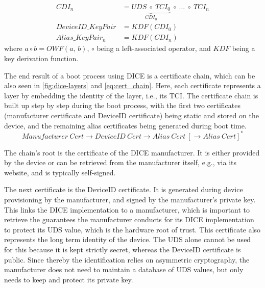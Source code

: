 \noindent
\begin{minipage}{\linewidth}
\begin{align}
  \label{eq:dice_cdi}
  CDI_n &= \underbrace{UDS\ \circ\ TCI_0}_{CDI_0}\ \circ\ \ldots\ \circ\ TCI_n\\
  \label{eq:dice_deviceID}
  DeviceID\_KeyPair &= KDF(CDI_0)\\
  \label{eq:dice_alias}
  Alias\_KeyPair_n  &= KDF(CDI_n)
\end{align}
where \(a \circ b = OWF(a,\,b)\), \(\circ\) being a left-associated operator, and \(KDF\) being a key derivation function.
\end{minipage}
\baselineskip


The end result of a boot process using \ac{DICE} is a certificate chain, which can be also seen in \autoref{fig:dice-layers} and \autoref{eq:cert_chain}.
Here, each certificate represents a layer by embedding the identity of the layer, i.e., its \ac{TCI}\@.
The certificate chain is built up step by step during the boot process, with the first two certificates (manufacturer certificate and DeviceID certificate) being static and stored on the device, and the remaining alias certificates being generated during boot time.
\begin{equation}
  \label{eq:cert_chain}
  Manufacturer\ Cert \rightarrow DeviceID\ Cert \rightarrow Alias\ Cert\ [\rightarrow Alias\ Cert]^*
\end{equation}

The chain's root is the certificate of the DICE manufacturer.
It is either provided by the device or can be retrieved from the manufacturer itself, e.g., via its website, and is typically self-signed.




The next certificate is the DeviceID certificate.
It is generated during device provisioning by the manufacturer, and signed by the manufacturer's private key.
This links the DICE implementation to a manufacturer, which is important to retrieve the guarantees the manufacturer conducts for its DICE implementation to protect its \ac{UDS} value, which is the hardware root of trust.
This certificate also represents the long term identity of the device.
The \ac{UDS} alone cannot be used for this because it is kept strictly secret, whereas the DeviceID certificate is public.
Since thereby the identification relies on asymmetric cryptography, the manufacturer does not need to maintain a database of \ac{UDS} values, but only needs to keep and protect its private key.

